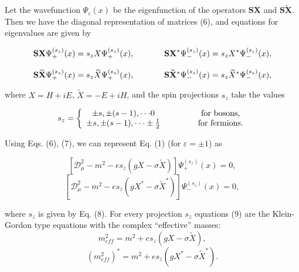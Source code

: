 \documentclass[a4paper,12pt]{article}
\begin{document}
Let the wavefunction $\Psi _\varepsilon (x)$ be the eigenfunction of the
operators $\mathbf{SX}$ and $\mathbf{S}\widetilde{\mathbf{X}}$. Then we have
the diagonal representation of matrices (6), and equations for eigenvalues
are given by

\[
\mathbf{SX}\Psi _{+}^{(s_z)}(x)=s_zX\Psi _{+}^{(s_z)}(x),\hspace{0.5in}
\mathbf{SX}^{*}\Psi _{-}^{(s_z)}(x)=s_zX^{*}\Psi _{-}^{(s_z)}(x),
\]
\vspace{-8mm}
\begin{equation}  \label{7}
\end{equation}
\vspace{-8mm}
\[
\mathbf{S}\widetilde{\mathbf{X}}\Psi _{+}^{(s_z)}(x)=s_z\widetilde{X}\Psi
_{+}^{(s_z)}(x),\hspace{0.5in}\mathbf{S}\widetilde{\mathbf{X}}^{*}\Psi
_{-}^{(s_z)}(x)=s_z\widetilde{X}^{*}\Psi _{-}^{(s_z)}(x),
\]

where $X=H+iE$, $\widetilde{X}=-E+iH$, and the spin projections $s_z$ take
the values

\begin{equation}
s_z=\biggl \{
\begin{array}{c}
\pm s,\pm (s-1),\cdot \cdot \cdot 0 \\
\pm s,\pm (s-1),\cdot \cdot \cdot \pm \frac 12
\end{array}
\hspace{0.5in}
\begin{array}{c}
\mbox{{for~bosons}}, \\
\mbox{{for~fermions}}.
\end{array}
\label{8}
\end{equation}

Using Eqs. (6), (7), we can represent Eq. (1) (for $\varepsilon =\pm 1$) as

\[
\left[ \mathcal{D}_\mu ^2-m^2-es_z\left( gX-\sigma \widetilde{X}\right)
\right] \Psi _{+}^{(s_z)}(x)=0,
\]
\vspace{-8mm}
\begin{equation}  \label{9}
\end{equation}
\vspace{-8mm}
\[
\left[ \mathcal{D}_\mu ^2-m^2-es_z\left( gX^{*}-\sigma \widetilde{X}
^{*}\right) \right] \Psi _{-}^{(s_z)}(x)=0,
\]

where $s_z$ is given by Eq. (8). For every projection $s_z$ equations (9)
are the Klein-Gordon type equations with the complex ``effective'' masses:
\[
m_{eff}^2=m^2+es_z\left( gX-\sigma \widetilde{X}\right),
\]
\vspace{-8mm}
\begin{equation}  \label{10}
\end{equation}
\vspace{-8mm}
\[
(m_{eff}^2)^{*}=m^2+es_z\left( gX^{*}-\sigma \widetilde{X}^{*}\right).
\]
\end{document}
